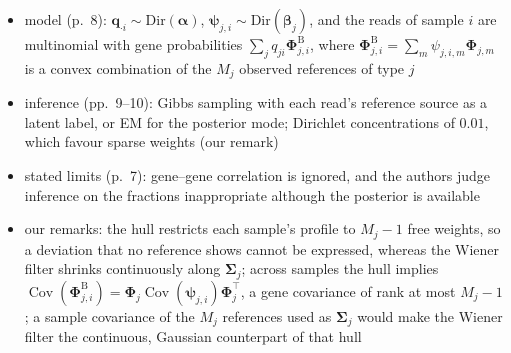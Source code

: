 \begin{itemize}
\begin{itemize}
    \item model (p.~8): \(\boldsymbol{q}_{\cdot i}\sim\mathrm{Dir}(\boldsymbol{\alpha})\), \(\boldsymbol{\psi}_{j,i}\sim\mathrm{Dir}(\boldsymbol{\beta}_{j})\), and the reads of sample \(i\)
          are multinomial with gene probabilities \(\sum_{j}q_{ji}\boldsymbol{\Phi}^{\mathrm{B}}_{j,i}\), where
          \(\boldsymbol{\Phi}^{\mathrm{B}}_{j,i}=\sum_{m}\psi_{j,i,m}\boldsymbol{\Phi}_{j,m}\) is a convex combination of the \(M_{j}\) observed references of type \(j\)
    \item inference (pp.~9--10): Gibbs sampling with each read's reference source as a latent label, or EM for the
          posterior mode; Dirichlet concentrations of \(0.01\), which favour sparse weights (our remark)
    \item stated limits (p.~7): gene--gene correlation is ignored, and the authors judge inference on the fractions
          inappropriate although the posterior is available
    \item our remarks: the hull restricts each sample's profile to \(M_{j}-1\) free weights, so a deviation that no reference
          shows cannot be expressed, whereas the Wiener filter shrinks continuously along \(\boldsymbol{\Sigma}_{j}\); across samples
          the hull implies
          \(\operatorname{Cov}(\boldsymbol{\Phi}^{\mathrm{B}}_{j,i})=\boldsymbol{\Phi}_{j}\operatorname{Cov}(\boldsymbol{\psi}_{j,i})\boldsymbol{\Phi}_{j}^{\top}\), a gene covariance of rank at most
          \(M_{j}-1\); a sample covariance of the \(M_{j}\) references used as \(\boldsymbol{\Sigma}_{j}\) would make the Wiener filter
          the continuous, Gaussian counterpart of that hull
  \end{itemize}
\end{itemize}

